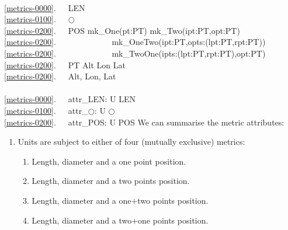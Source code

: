 \bp
{}\\
\ref{metrics-0000}.\ \ \ LEN\\
\ref{metrics-0100}.\ \ \ $\bigcirc$\\
\ref{metrics-0200}.\ \ \ POS {\EQ}{\EQ} mk\_One(pt:PT) {\BAR} mk\_Two(ipt:PT,opt:PT)\\
\ref{metrics-0200}.\ \ \ \ \ \ \ \ \ \ \ \ \ {\BAR} mk\_OneTwo(ipt:PT,opts:(lpt:PT,rpt:PT)) \\
\ref{metrics-0200}.\ \ \ \ \ \ \ \ \ \ \ \ \ {\BAR} mk\_TwoOne(ipts:(lpt:PT,rpt:PT),opt:PT)\ \ \\
\ref{metrics-0200}.\ \ \ PT {\EQ} Alt {\TIMES} Lon {\TIMES} Lat\ \ \\
\ref{metrics-0200}.\ \ \ Alt, Lon, Lat {\EQ} {\DOTDOTDOT}\\
\\
\ref{metrics-0000}.\ \ \ attr\_LEN: U {\RIGHTARROW} LEN\\
\ref{metrics-0100}.\ \ \ attr\_$\bigcirc$: U {\RIGHTARROW} $\bigcirc$\\
\ref{metrics-0200}.\ \ \ attr\_POS: U {\RIGHTARROW} POS
\ep
\mnewfoil\normalsize\HHHH
\noindent
\begynd
\pind We can summarise the metric attributes:
\afslut
\begin{enumerate}\setei
\item \label{metrics-0500} Units are subject to either of four
  (mutually exclusive) metrics:
\begin{enumerate}
\item \label{metrics-0510} Length, diameter and a one point position.  
\item \label{metrics-0520} Length, diameter and a two points position. 
\item \label{metrics-0530} Length, diameter and a one+two points position. 
\item \label{metrics-0540} Length, diameter and a two+one points position. 
\end{enumerate}
\savei\end{enumerate}
